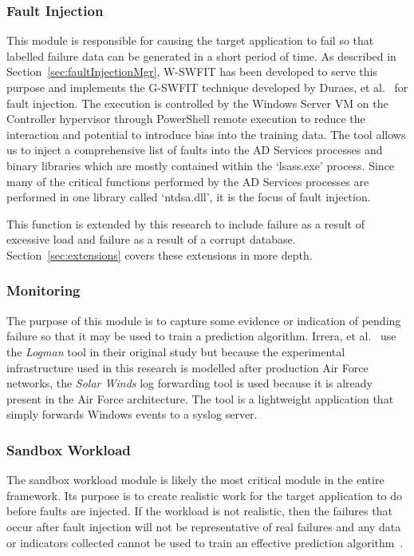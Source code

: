 \subsubsection{Fault Injection} \label{sec:faultInjectionTool} 
This module is responsible for causing the target application to fail so that
labelled failure data can be generated in a short period of time.  As described
in Section~\ref{sec:faultInjectionMgr}, \ac{W-SWFIT} has been developed to
serve this purpose and implements the \ac{G-SWFIT} technique developed by
Duraes, et al.~\cite{gswfit} for fault injection.  The execution is controlled
by the Windows Server \ac{VM} on the Controller hypervisor through PowerShell
remote execution to reduce the interaction and potential to introduce bias into
the training data.  The tool allows us to inject a comprehensive list of faults
into the \ac{AD} Services processes and binary libraries which are mostly
contained within the `lsass.exe' process.  Since many of the critical functions
performed by the \ac{AD} Services processes are performed in one library called
`ntdsa.dll', it is the focus of fault injection.

This function is extended by this research to include failure as a result of
excessive load and failure as a result of a corrupt database.
Section~\ref{sec:extensions} covers these extensions in more depth.

\subsubsection{Monitoring} \label{sec:sandboxMonitoringTool} 
The purpose of this module is to capture some evidence or indication of pending
failure so that it may be used to train a prediction algorithm.  Irrera, et
al.~\cite{irrera2015} use the \emph{Logman} tool in their original study but
because the experimental infrastructure used in this research is modelled after
production Air Force networks, the \emph{Solar Winds} log forwarding tool is
used because it is already present in the Air Force architecture.  The tool is
a lightweight application that simply forwards Windows events to a syslog
server.

\subsubsection{Sandbox Workload}  \label{sec:sandboxWorkload} 
The sandbox workload module is likely the most critical module in the entire
framework.  Its purpose is to create realistic work for the target application
to do before faults are injected.  If the workload is not realistic, then the
failures that occur after fault injection will not be representative of real
failures and any data or indicators collected cannot be used to train an
effective prediction algorithm~\cite{cotroneo2012,kikuchi2014,irrera2015}.

